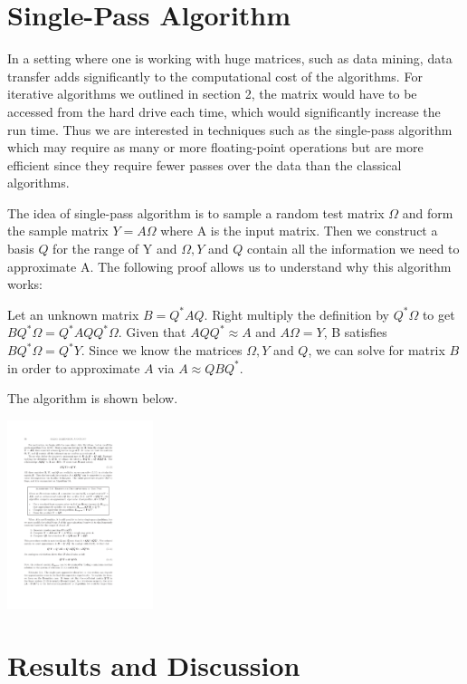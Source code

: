 \documentclass[11pt]{amsart}
\begin{document}
\section{Single-Pass Algorithm}
In a setting where one is working with huge matrices, such as data mining, data transfer adds significantly to the computational cost of the algorithms. For iterative algorithms we outlined in section 2, the matrix would have to be accessed from the hard drive each time, which would significantly increase the run time. Thus we are interested in techniques such as the single-pass algorithm which may require as many or more floating-point operations but are more efficient since they require fewer passes over the data than the classical algorithms. 

The idea of single-pass algorithm is to sample a random test matrix $\Omega$ and form the sample matrix $Y = A\Omega$ where A is the input matrix. Then we construct a basis $Q$ for the range of Y and $\Omega, Y$ and $Q$ contain all the information we need to approximate A. The following proof allows us to understand why this algorithm works:

Let an unknown matrix $B = Q^{\ast}AQ$. Right multiply the definition by $Q^{\ast}\Omega$ to get $BQ^{\ast}\Omega = Q^{\ast}AQQ^{\ast}\Omega$. Given that $AQQ^{\ast} \approx A$ and $A\Omega = Y$, B satisfies $BQ^{\ast}\Omega = Q^{\ast}Y$. Since we know the matrices $\Omega, Y$ and $Q$, we can solve for matrix $B$ in order to approximate $A$ via $A \approx QBQ^{\ast}$. 

The algorithm is shown below.

\begin{center}
\includegraphics[height=5.5cm]{../graph/singlepass-eps-converted-to.pdf}
\end{center}

\section{Results and Discussion}
\end{document}
